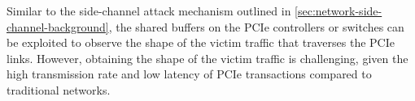 Similar to the side-channel attack mechanism outlined in \ref{sec:network-side-channel-background}, the shared buffers on the PCIe controllers or switches can be exploited to observe the shape of the victim traffic that traverses the PCIe links.
However, obtaining the shape of the victim traffic is challenging, given the high transmission rate and low latency of PCIe transactions compared to traditional networks.

